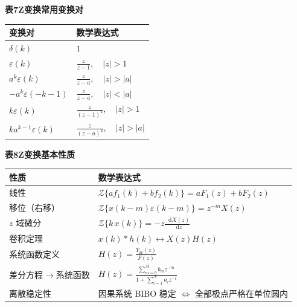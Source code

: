 \documentclass[12pt,a4paper]{ctexart}
\newcommand{\eps}{\varepsilon}
\newcommand{\dif}{\mathop{}\!\mathrm{d}}
\begin{document}
\par\bigskip
\noindent\textbf{表7\quad Z变换常用变换对}
\vspace{0.4em}

\begin{tabular}{p{}p{}}
\toprule
\textbf{变换对} & \textbf{数学表达式}\\
\midrule
$\displaystyle\delta(k)$ & $1$\\[0.35em]
$\displaystyle\eps(k)$ & $\displaystyle\frac{z}{z-1},\quad |z|>1$\\[0.35em]
$\displaystyle a^k\eps(k)$ & $\displaystyle\frac{z}{z-a},\quad |z|>|a|$\\[0.35em]
$\displaystyle -a^k\eps(-k-1)$ & $\displaystyle\frac{z}{z-a},\quad |z|<|a|$\\[0.35em]
$\displaystyle k\eps(k)$ & $\displaystyle\frac{z}{(z-1)^2},\quad |z|>1$\\[0.35em]
$\displaystyle ka^{k-1}\eps(k)$ & $\displaystyle\frac{z}{(z-a)^2},\quad |z|>|a|$\\
\bottomrule
\end{tabular}

\par\bigskip
\noindent\textbf{表8\quad Z变换基本性质}
\vspace{0.4em}

\begin{tabular}{p{}p{}}
\toprule
\textbf{性质} & \textbf{数学表达式}\\
\midrule
线性 & $\displaystyle\mathcal Z\{af_1(k)+bf_2(k)\}=aF_1(z)+bF_2(z)$\\[0.35em]
移位（右移） & $\displaystyle\mathcal Z\{x(k-m)\eps(k-m)\}=z^{-m}X(z)$\\[0.35em]
$z$ 域微分 & $\displaystyle\mathcal Z\{k\,x(k)\}=-z\frac{\dif X(z)}{\dif z}$\\[0.35em]
卷积定理 & $\displaystyle x(k)*h(k)\longleftrightarrow X(z)H(z)$\\[0.35em]
系统函数定义 & $\displaystyle H(z)=\frac{Y_{\mathrm{zs}}(z)}{F(z)}$\\[0.35em]
差分方程$\to$系统函数 & $\displaystyle H(z)=\frac{\displaystyle\sum_{m=0}^{M}b_mz^{-m}}{1+\displaystyle\sum_{i=1}^{N}a_iz^{-i}}$\\[0.35em]
离散稳定性 & 因果系统 BIBO 稳定 $\iff$ 全部极点严格在单位圆内\\
\bottomrule
\end{tabular}

\bigskip
\end{document}
